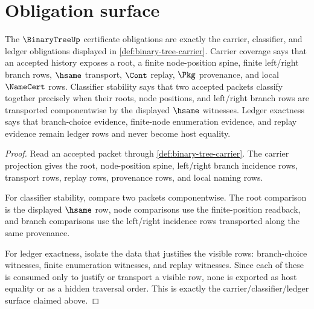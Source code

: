 \section{Obligation surface}
\label{sec:binary-tree-obligation-surface}

\begin{theorem}
\label{thm:binary-tree-namecert-obligation-surface}
The $\BinaryTreeUp$ certificate obligations are exactly the carrier, classifier, and ledger obligations displayed in \autoref{def:binary-tree-carrier}. Carrier coverage says that an accepted history exposes a root, a finite node-position spine, finite left/right branch rows, $\hsame$ transport, $\Cont$ replay, $\Pkg$ provenance, and local $\NameCert$ rows. Classifier stability says that two accepted packets classify together precisely when their roots, node positions, and left/right branch rows are transported componentwise by the displayed $\hsame$ witnesses. Ledger exactness says that branch-choice evidence, finite-node enumeration evidence, and replay evidence remain ledger rows and never become host equality.
\end{theorem}
\begin{proof}
Read an accepted packet through \autoref{def:binary-tree-carrier}. The carrier projection gives the root, node-position spine, left/right branch incidence rows, transport rows, replay rows, provenance rows, and local naming rows.

For classifier stability, compare two packets componentwise. The root comparison is the displayed $\hsame$ row, node comparisons use the finite-position readback, and branch comparisons use the left/right incidence rows transported along the same provenance.

For ledger exactness, isolate the data that justifies the visible rows: branch-choice witnesses, finite enumeration witnesses, and replay witnesses. Since each of these is consumed only to justify or transport a visible row, none is exported as host equality or as a hidden traversal order. This is exactly the carrier/classifier/ledger surface claimed above.
\end{proof}

